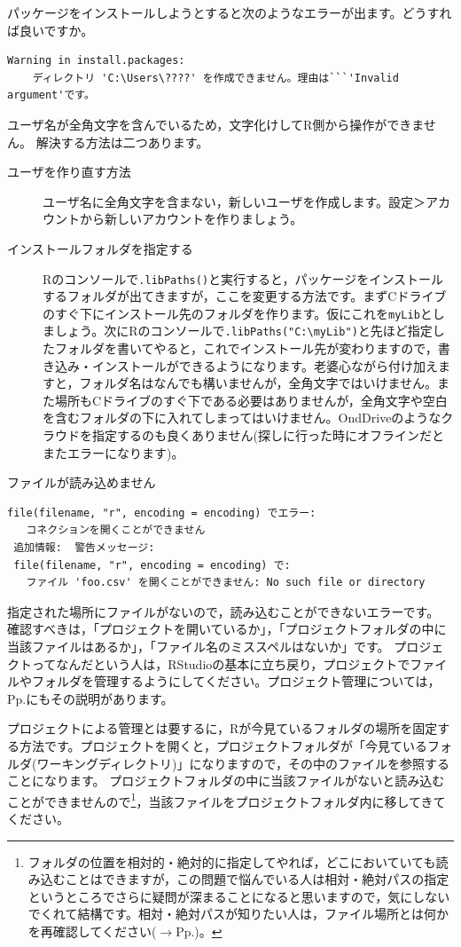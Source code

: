 \documentclass{ltjsbook}
\begin{document}
\begin{FAQ}{パッケージをインストールしようとすると次のようなエラーが出ます。どうすれば良いですか。}{}
\begin{verbatim}
Warning in install.packages:
    ディレクトリ 'C:\Users\????' を作成できません。理由は```'Invalid argument'です。
\end{verbatim}
ユーザ名が全角文字を含んでいるため，文字化けしてR側から操作ができません。
解決する方法は二つあります。
\begin{description}
    \item [ユーザを作り直す方法] ユーザ名に全角文字を含まない，新しいユーザを作成します。設定＞アカウントから新しいアカウントを作りましょう。
    \item [インストールフォルダを指定する] Rのコンソールで\verb|.libPaths()|と実行すると，パッケージをインストールするフォルダが出てきますが，ここを変更する方法です。まずCドライブのすぐ下にインストール先のフォルダを作ります。仮にこれを\verb|myLib|としましょう。次にRのコンソールで\verb|.libPaths("C:\myLib")|と先ほど指定したフォルダを書いてやると，これでインストール先が変わりますので，書き込み・インストールができるようになります。老婆心ながら付け加えますと，フォルダ名はなんでも構いませんが，全角文字ではいけません。また場所もCドライブのすぐ下である必要はありませんが，全角文字や空白を含むフォルダの下に入れてしまってはいけません。OndDriveのようなクラウドを指定するのも良くありません(探しに行った時にオフラインだとまたエラーになります)。
\end{description}
\end{FAQ}


\begin{FAQ}{ファイルが読み込めません}{}
    \begin{verbatim}
file(filename, "r", encoding = encoding) でエラー:
   コネクションを開くことができません
 追加情報:  警告メッセージ:
 file(filename, "r", encoding = encoding) で:
   ファイル 'foo.csv' を開くことができません: No such file or directory
    \end{verbatim}
指定された場所にファイルがないので，読み込むことができないエラーです。
確認すべきは，「プロジェクトを開いているか」，「プロジェクトフォルダの中に当該ファイルはあるか」，「ファイル名のミススペルはないか」です。
プロジェクトってなんだという人は，RStudioの基本に立ち戻り，プロジェクトでファイルやフォルダを管理するようにしてください。プロジェクト管理については，Pp.\pageref{UnderProject}にもその説明があります。

プロジェクトによる管理とは要するに，Rが今見ているフォルダの場所を固定する方法です。プロジェクトを開くと，プロジェクトフォルダが「今見ているフォルダ(ワーキングディレクトリ)」になりますので，その中のファイルを参照することになります。
プロジェクトフォルダの中に当該ファイルがないと読み込むことができませんので\footnote{フォルダの位置を相対的・絶対的に指定してやれば，どこにおいていても読み込むことはできますが，この問題で悩んでいる人は相対・絶対パスの指定というところでさらに疑問が深まることになると思いますので，気にしないでくれて結構です。相対・絶対パスが知りたい人は，ファイル場所とは何かを再確認してください($\to$Pp.\pageref{filelocale})。}，当該ファイルをプロジェクトフォルダ内に移してきてください。
\end{FAQ}
\end{document}
